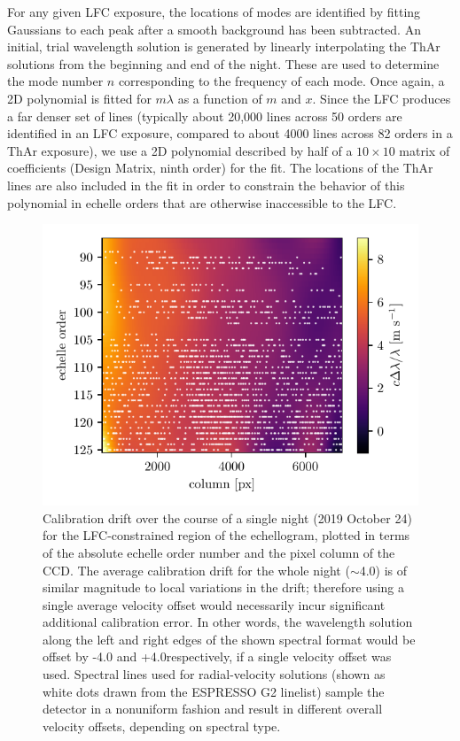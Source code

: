 For any given LFC exposure, the locations of modes are identified by fitting Gaussians to each peak after a smooth background has been subtracted. An initial, trial wavelength solution is generated by linearly interpolating the ThAr solutions from the beginning and end of the night. These are used to determine the mode number \(n\) corresponding to the frequency of each mode. Once again, a 2D polynomial is fitted for \(m\lambda\) as a function of \(m\) and \(x\). Since the LFC produces a far denser set of lines (typically about 20,000 lines across 50 orders are identified in an LFC exposure, compared to about 4000 lines across 82 orders in a ThAr exposure), we use a 2D polynomial described by half of a $10\times10$ matrix of coefficients (Design Matrix, ninth order) for the fit. The locations of the ThAr lines are also included in the fit in order to constrain the behavior of this polynomial in echelle orders that are otherwise inaccessible to the LFC.

\begin{figure}[htbp]
    \centering
    \includegraphics[width=\textwidth]{figures-4/drift.pdf}
    \caption{Calibration drift over the course of a single night (2019 October 24) for the LFC-constrained region of the echellogram, plotted in terms of the absolute echelle order number and the pixel column of the CCD. The average calibration drift for the whole night ($\sim$4.0\ms) is of similar magnitude to local variations in the drift; therefore using a single average velocity offset would necessarily incur significant additional calibration error. In other words, the wavelength solution along the left and right edges of the shown spectral format would be offset by -4.0 and +4.0\ms respectively, if a single velocity offset was used. Spectral lines used for radial-velocity solutions (shown as white dots drawn from the ESPRESSO G2 linelist) sample the detector in a nonuniform fashion and result in different overall velocity offsets, depending on spectral type.}
    \label{fig:caldrift}
\end{figure}

